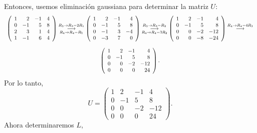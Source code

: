 \documentclass[11pt,letterpaper]{article}
\newcommand{\grstep}[2][\relax]{%
   \ensuremath{\mathrel{
       {\mathop{\longrightarrow}\limits^{#2\mathstrut}_{
                                     \begin{subarray}{l} #1 \end{subarray}}}}}}
\begin{document}
\begin{enumerate}
Entonces, usemos eliminación gaussiana para determinar la matriz $U$:
\begin{equation*}
\begin{array}{c}
\left(
\begin{array}{rrrr}
 1 &  2 & -1 & 4\\
 0 & -1 &  5 & 8\\
 2 &  3 &  1 & 4\\
 1 & -1 &  6 & 4
\end{array}
\right)%
\grstep[R_4 \rightarrow R_4-R_1]{R_3 \rightarrow R_3-2R_1}
%
\left(
\begin{array}{rrrr}
 1 &  2 & -1 &  4\\
 0 & -1 &  5 &  8\\
 0 & -1 &  3 & -4\\
 0 & -3 &  7 &  0
\end{array}
\right) %
\grstep[R_4 \rightarrow R_4-3R_2]{R_3 \rightarrow R_3-R_2}
% 
\left(
\begin{array}{rrrr}
 1 &  2 & -1 &   4\\
 0 & -1 &  5 &   8\\
 0 &  0 & -2 & -12\\
 0 &  0 & -8 & -24
\end{array}
\right) %
\grstep[]{R_4 \rightarrow R_4-4R_3}
\\
\\
\left(
\begin{array}{rrrr}
 1 &  2 & -1 &   4\\
 0 & -1 &  5 &   8\\
 0 &  0 & -2 & -12\\
 0 &  0 &  0 & 24
\end{array}
\right).
\end{array} 
\end{equation*}
Por lo tanto, 
\begin{equation*}
U=\left(
\begin{array}{rrrr}
 1 &  2 & -1 &   4\\
 0 & -1 &  5 &   8\\
 0 &  0 & -2 & -12\\
 0 &  0 &  0 & 24
\end{array}
\right).
\end{equation*}
Ahora determinaremos $L$, 


\end{enumerate}
\end{document}
